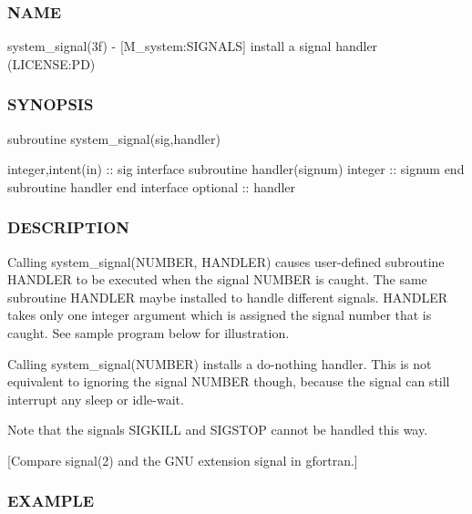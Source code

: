 \subsubsection*{N\+A\+ME}

system\+\_\+signal(3f) -\/ \mbox{[}M\+\_\+system\+:S\+I\+G\+N\+A\+LS\mbox{]} install a signal handler (L\+I\+C\+E\+N\+SE\+:PD) 

\subsubsection*{S\+Y\+N\+O\+P\+S\+IS}

\begin{DoxyVerb} subroutine system_signal(sig,handler)

    integer,intent(in) :: sig
    interface
      subroutine handler(signum)
      integer :: signum
      end subroutine handler
    end interface
    optional :: handler
\end{DoxyVerb}


\subsubsection*{D\+E\+S\+C\+R\+I\+P\+T\+I\+ON}

Calling system\+\_\+signal(\+N\+U\+M\+B\+E\+R, H\+A\+N\+D\+L\+E\+R) causes user-\/defined subroutine H\+A\+N\+D\+L\+ER to be executed when the signal N\+U\+M\+B\+ER is caught. The same subroutine H\+A\+N\+D\+L\+ER maybe installed to handle different signals. H\+A\+N\+D\+L\+ER takes only one integer argument which is assigned the signal number that is caught. See sample program below for illustration.

Calling system\+\_\+signal(\+N\+U\+M\+B\+E\+R) installs a do-\/nothing handler. This is not equivalent to ignoring the signal N\+U\+M\+B\+ER though, because the signal can still interrupt any sleep or idle-\/wait.

Note that the signals S\+I\+G\+K\+I\+LL and S\+I\+G\+S\+T\+OP cannot be handled this way.

\mbox{[}Compare signal(2) and the G\+NU extension signal in gfortran.\mbox{]}

\subsubsection*{E\+X\+A\+M\+P\+LE}


